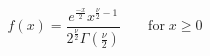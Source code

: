 

\[
f(x) = \frac{e^{\frac{-x} {2}}x^{\frac{\nu} {2} - 1}} {2^{\frac{\nu} {2}}\Gamma(\frac{\nu} {2}) } \;\;\;\;\;\;\; \mbox{for} \; x \ge 0
\]



